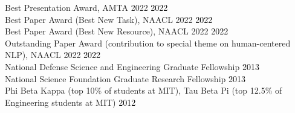 {}

Best Presentation Award, AMTA 2022 \hfill \textcolor{black}{2022}\\ %
Best Paper Award (Best New Task), NAACL 2022 \hfill \textcolor{black}{2022}\\ %
Best Paper Award (Best New Resource), NAACL 2022 \hfill \textcolor{black}{2022}\\ %
Outstanding Paper Award (contribution to special theme on human-centered NLP), NAACL 2022 \hfill \textcolor{black}{2022}\\ %
National Defense Science and Engineering Graduate Fellowship \hfill \textcolor{black}{2013}\\ %
National Science Foundation Graduate Research Fellowship \hfill \textcolor{black}{2013}\\ %
Phi Beta Kappa (top 10\% of students at MIT), Tau Beta Pi (top 12.5\% of Engineering students at MIT) \hfill \textcolor{black}{2012}\\
